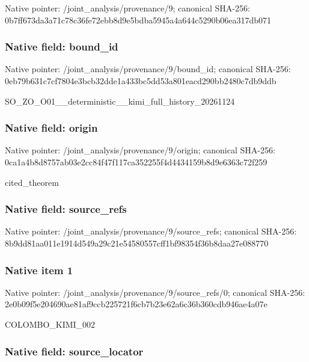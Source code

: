 \documentclass[10pt,a4paper]{article}
\begin{document}
Native pointer: /joint\_analysis/provenance/9; canonical SHA-256: 0b7ff673da3a71c78c36fe72\allowbreak{}ebb8d9e5bdba5945a4a644c5\allowbreak{}290b06ea317db071



\subsubsection{Native field: bound\_id}


Native pointer: /joint\_analysis/provenance/9/bound\_id; canonical SHA-256: 0eb79b631c7cf7804e3bcb32\allowbreak{}dde1a433bc5dd53a801eacd2\allowbreak{}90bb2480c7db9ddb


SO\_ZO\_O01\_\_deterministic\allowbreak{}\_\_kimi\_full\_history\_2026\allowbreak{}1124


\subsubsection{Native field: origin}


Native pointer: /joint\_analysis/provenance/9/origin; canonical SHA-256: 0ca1a4b8d8757ab03e2cc84f\allowbreak{}47f117ca352255f4d4434159\allowbreak{}b8d9e6363c72f259


cited\_theorem


\subsubsection{Native field: source\_refs}


Native pointer: /joint\_analysis/provenan\allowbreak{}ce/9/source\_refs; canonical SHA-256: 8b9dd81aa011e1914d549a29\allowbreak{}c21e54580557cff1bf98354f\allowbreak{}36b8daa27e088770



\subsubsection{Native item 1}


Native pointer: /joint\_analysis/provenan\allowbreak{}ce/9/source\_refs/0; canonical SHA-256: 2e0b09f5e204690ae81af9cc\allowbreak{}b225721f6cb7b23e62a6c36b\allowbreak{}360cdb946ae4a07e


COLOMBO\_KIMI\_002


\subsubsection{Native field: source\_locator}
\end{document}
